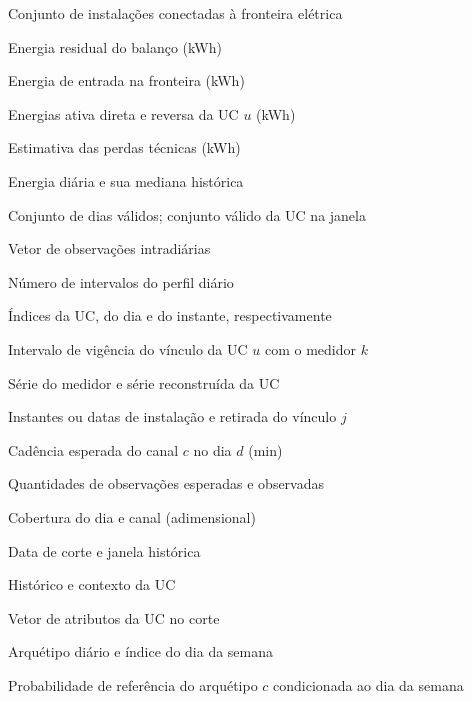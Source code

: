 \begin{description}[labelsep=4mm,labelwidth=42mm,leftmargin=46mm,align=left]
  \item[$\mathcal U$] Conjunto de instalações conectadas à fronteira elétrica
  \item[$E_{\mathrm{res}}$] Energia residual do balanço (kWh)
  \item[$E_{\mathrm{entrada}}$] Energia de entrada na fronteira (kWh)
  \item[$E_{\mathrm{FA},u}$, $E_{\mathrm{RA},u}$] Energias ativa direta e reversa da UC $u$ (kWh)
  \item[$\widehat E_{\mathrm{tec}}$] Estimativa das perdas técnicas (kWh)
  \item[$E_d$, $\widetilde E$] Energia diária e sua mediana histórica
  \item[$V$, $V_{u,W}$] Conjunto de dias válidos; conjunto válido da UC na janela
  \item[$\mathbf{x}_d$] Vetor de observações intradiárias
  \item[$T$] Número de intervalos do perfil diário
  \item[$u$, $d$, $t$] Índices da UC, do dia e do instante, respectivamente
  \item[$I_{u,k}$] Intervalo de vigência do vínculo da UC $u$ com o medidor $k$
  \item[$Y_k(t)$, $X_u(t)$] Série do medidor e série reconstruída da UC
  \item[$t_{\mathrm{inst},j}$, $t_{\mathrm{ret},j}$] Instantes ou datas de instalação e retirada do vínculo $j$
  \item[$\Delta t_{d,c}$] Cadência esperada do canal $c$ no dia $d$ (min)
  \item[$N_{\mathrm{esp}}$, $N_{\mathrm{obs}}$] Quantidades de observações esperadas e observadas
  \item[$C(d,c)$] Cobertura do dia e canal (adimensional)
  \item[$t_c$, $W$] Data de corte e janela histórica
  \item[$\mathcal H_u$, $\mathcal C_u$] Histórico e contexto da UC
  \item[$\mathbf{x}_{u,t_c}$] Vetor de atributos da UC no corte
  \item[$c_{u,d}$, $w$] Arquétipo diário e índice do dia da semana
  \item[$q^{base}_{u,w}(c)$] Probabilidade de referência do arquétipo $c$ condicionada ao dia da semana

\end{description}
